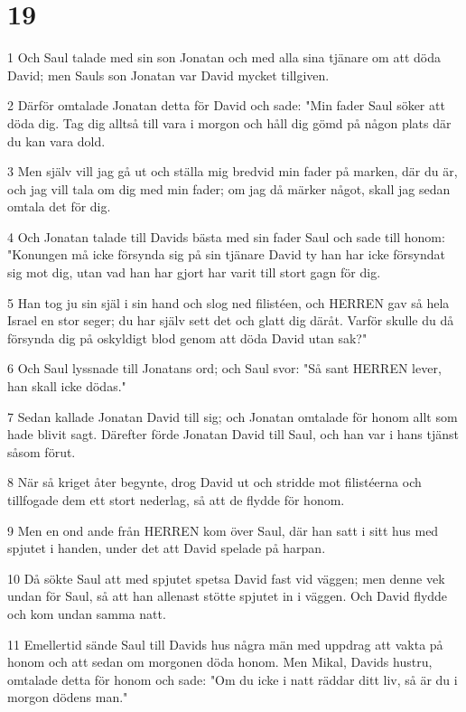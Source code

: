 \chapter{19}

\par 1 Och Saul talade med sin son Jonatan och med alla sina tjänare om att döda David; men Sauls son Jonatan var David mycket tillgiven.
\par 2 Därför omtalade Jonatan detta för David och sade: "Min fader Saul söker att döda dig. Tag dig alltså till vara i morgon och håll dig gömd på någon plats där du kan vara dold.
\par 3 Men själv vill jag gå ut och ställa mig bredvid min fader på marken, där du är, och jag vill tala om dig med min fader; om jag då märker något, skall jag sedan omtala det för dig.
\par 4 Och Jonatan talade till Davids bästa med sin fader Saul och sade till honom: "Konungen må icke försynda sig på sin tjänare David ty han har icke försyndat sig mot dig, utan vad han har gjort har varit till stort gagn för dig.
\par 5 Han tog ju sin själ i sin hand och slog ned filistéen, och HERREN gav så hela Israel en stor seger; du har själv sett det och glatt dig däråt. Varför skulle du då försynda dig på oskyldigt blod genom att döda David utan sak?"
\par 6 Och Saul lyssnade till Jonatans ord; och Saul svor: "Så sant HERREN lever, han skall icke dödas."
\par 7 Sedan kallade Jonatan David till sig; och Jonatan omtalade för honom allt som hade blivit sagt. Därefter förde Jonatan David till Saul, och han var i hans tjänst såsom förut.
\par 8 När så kriget åter begynte, drog David ut och stridde mot filistéerna och tillfogade dem ett stort nederlag, så att de flydde för honom.
\par 9 Men en ond ande från HERREN kom över Saul, där han satt i sitt hus med spjutet i handen, under det att David spelade på harpan.
\par 10 Då sökte Saul att med spjutet spetsa David fast vid väggen; men denne vek undan för Saul, så att han allenast stötte spjutet in i väggen. Och David flydde och kom undan samma natt.
\par 11 Emellertid sände Saul till Davids hus några män med uppdrag att vakta på honom och att sedan om morgonen döda honom. Men Mikal, Davids hustru, omtalade detta för honom och sade: "Om du icke i natt räddar ditt liv, så är du i morgon dödens man."
